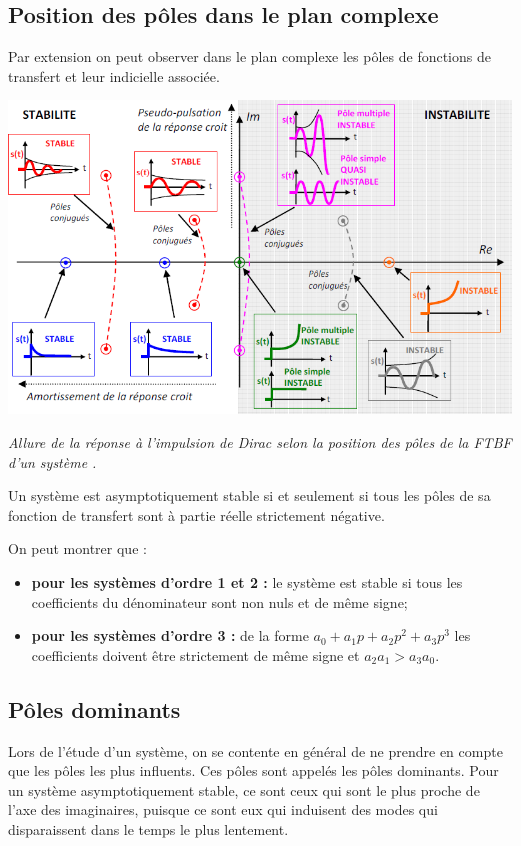 \documentclass[10pt,fleqn]{article} %
\begin{document}
\subsection{Position des pôles dans le plan complexe}
Par extension on peut observer dans le plan complexe les pôles de fonctions de transfert et leur indicielle associée.

\begin{center}
\includegraphics[width=\linewidth]{images/plan_complexe_fm}

\textit{Allure de la réponse à l’impulsion de Dirac selon la position des pôles de la FTBF d’un système \cite{2}.}
\end{center}

\begin{defi}[À retenir]
Un système est asymptotiquement stable si et seulement si tous les pôles de sa fonction de transfert sont à partie réelle strictement négative. 
\end{defi}

\begin{rem}On peut montrer que :
\begin{itemize}
\item \textbf{pour les systèmes d'ordre 1 et 2 :} le système est stable si tous les coefficients du dénominateur sont non nuls et de même signe;
\item \textbf{pour les systèmes d'ordre 3 :} de la forme $a_0+a_1p+a_2p^2+a_3p^3$ les coefficients doivent être strictement de même signe et $a_2 a_1 > a_3 a_0$.
\end{itemize}
\end{rem}

\subsection{Pôles dominants \cite{1}}
Lors de l’étude d’un système, on se contente en général de ne prendre en compte que les pôles les plus influents. Ces pôles sont appelés les pôles dominants. Pour un système asymptotiquement stable, ce sont ceux qui sont le plus proche de l’axe des imaginaires, puisque ce sont eux qui induisent des modes qui disparaissent dans le temps le plus lentement.
\end{document}
